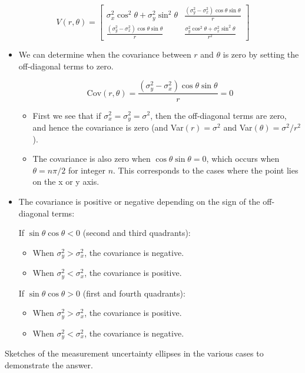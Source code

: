 \documentclass[10pt]{article}
\begin{document}
\[
	\boxed{V(r,\theta) =
		\begin{bmatrix}
			\sigma_x^2\cos^2\theta + \sigma_y^2\sin^2\theta       & \frac{(\sigma_y^2-\sigma_x^2)\cos\theta\sin\theta}{r}       \\
			\frac{(\sigma_y^2-\sigma_x^2)\cos\theta\sin\theta}{r} & \frac{\sigma_y^2\cos^2\theta + \sigma_x^2\sin^2\theta}{r^2}
		\end{bmatrix}}
\]

\begin{itemize}
	\item We can determine when the covariance between $r$ and $\theta$ is zero by setting the off-diagonal terms to zero.

	      \[ \text{Cov}(r,\theta) = \dfrac{(\sigma_y^2-\sigma_x^2)\cos\theta\sin\theta}{r} = 0 \]
	      \begin{itemize}
		      \item First we see that if $\sigma_x^2 = \sigma_y^2 = \sigma^2$, then the off-diagonal terms are zero, and hence the covariance is zero (and Var$(r) = \sigma^2$ and Var$(\theta) = \sigma^2/r^2$).
		      \item The covariance is also zero when $\cos\theta\sin\theta = 0$, which occurs when $\theta = n\pi/2$ for integer $n$. This corresponds to the cases where the point lies on the x or y axis.
	      \end{itemize}
	\item The covariance is positive or negative depending on the sign of the off-diagonal terms:

	      If $\sin\theta\cos\theta < 0$ (second and third quadrants):
	      \begin{itemize}
		      \item When $\sigma_y^2 > \sigma_x^2$, the covariance is negative.
		      \item When $\sigma_y^2 < \sigma_x^2$, the covariance is positive.
	      \end{itemize}
	      If $\sin\theta\cos\theta > 0$ (first and fourth quadrants):
	      \begin{itemize}
		      \item When $\sigma_y^2 > \sigma_x^2$, the covariance is positive.
		      \item When $\sigma_y^2 < \sigma_x^2$, the covariance is negative.
	      \end{itemize}
\end{itemize}

Sketches of the measurement uncertainty ellipses in the various cases to demonstrate the answer.
\end{document}
